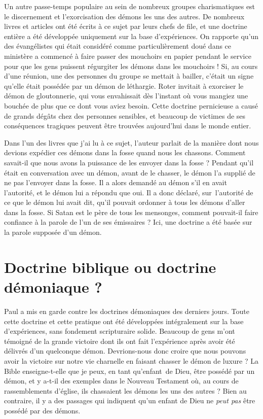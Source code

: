Un autre passe-temps populaire au sein de nombreux groupes charismatiques
 est le discernement et l'exorcisation des démons les uns des autres.
 De nombreux livres et articles ont été écrits à ce sujet par leurs chefs de file,
 et une doctrine entière a été développée uniquement sur la base d'expériences.
 On rapporte qu'un des évangélistes qui était considéré
 comme particulièrement doué dans ce ministère a commencé à faire passer
 des mouchoirs en papier pendant le service pour que les gens puissent
 régurgiter les démons dans les mouchoirs ! Si, au cours d'une réunion,
 une des personnes du groupe se mettait à bailler, c'était un signe
 qu'elle était possédée par un démon de léthargie. Roter invitait à exorciser le
 démon de gloutonnerie, qui vous envahissait dès l'instant
 où vous mangiez une bouchée de plus que ce dont vous aviez besoin.
 Cette doctrine pernicieuse a causé de grands dégâts chez des personnes
 sensibles, et beaucoup de victimes de ses conséquences tragiques
 peuvent être trouvées aujourd'hui dans le monde entier.

Dans l'un des livres que j'ai lu à ce sujet, l'auteur parlait
 de la manière dont nous devions expédier ces démons dans la fosse
 quand nous les chassons. Comment savait-il que nous avons la puissance
 de les envoyer dans la fosse ? Pendant qu'il était en conversation
 avec un démon, avant de le chasser, le démon l'a supplié de ne pas
 l'envoyer dans la fosse. Il a alors demandé au démon s'il en avait
 l'autorité, et le démon lui a répondu que oui.
 Il a donc déclaré, sur~l'autorité de ce que le démon lui avait dit,
 qu'il pouvait ordonner à tous les démons d'aller dans la fosse.
 Si Satan  est le père de tous les mensonges,
 comment pouvait-il faire
 confiance à la parole de l'un de ses émissaires ?
 Ici, une doctrine a été basée sur la parole supposée d'un démon.


\section{Doctrine biblique ou doctrine d\'emoniaque ?}

Paul a mis en garde contre les doctrines démoniaques des derniers jours.
 Toute cette doctrine et cette pratique ont été développées intégralement
 sur la base d'expériences, sans fondement scripturaire solide.
 Beaucoup de gens m'ont témoigné de la grande victoire dont ils ont fait
 l'expérience après avoir été délivrés d'un quelconque démon.
 Devrions-nous donc croire que nous pouvons avoir la victoire
 sur notre vie charnelle en faisant chasser le démon de luxure ?
 La Bible enseigne-t-elle que je peux, en tant qu'enfant~de Dieu,
 être possédé par un démon, et y a-t-il des exemples dans le Nouveau
 Testament où, au cours de rassemblements d'église, ils chassaient
 les démons les uns des autres ? Bien au contraire, il y a des passages
 qui indiquent qu'un enfant de Dieu ne \emph{peut pas} être possédé par des démons.

